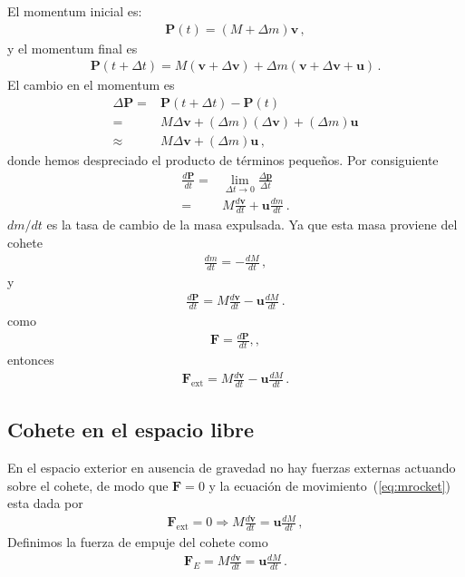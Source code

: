 El momentum inicial es:
\begin{align}
  \mathbf{P}(t)=(M+\Delta m)\mathbf{v}\,,
\end{align}
y el momentum final es
\begin{align}
  \mathbf{P}(t+\Delta t)=M(\mathbf{v}+\Delta\mathbf{v})+\Delta m(\mathbf{v}+\Delta\mathbf{v}+\mathbf{u})\,.
\end{align}
El cambio en el momentum es
\begin{align}
  \Delta\mathbf{P}=&\mathbf{P}(t+\Delta t)-\mathbf{P}(t)\nonumber\\
=&M\Delta\mathbf{v}+(\Delta m)(\Delta\mathbf{v})+(\Delta m)\mathbf{u}\nonumber\\
\approx &M\Delta\mathbf{v}+(\Delta m)\mathbf{u}\,,
\end{align}
donde hemos despreciado el producto de términos pequeños. Por consiguiente
\begin{align}
  \frac{d\mathbf{P}}{dt}=&\lim_{\Delta t\to 0}\frac{\Delta\mathbf{p}}{\Delta t}\nonumber\\
=&M\frac{d\mathbf{v}}{dt}+\mathbf{u}\frac{dm}{dt}\,.
\end{align}
$dm/dt$ es la tasa de cambio de la masa expulsada. Ya que esta masa proviene del cohete
\begin{align}
  \frac{dm}{dt}=-\frac{dM}{dt}\,,
\end{align}
y
\begin{align}
  \frac{d\mathbf{P}}{dt}=M\frac{d\mathbf{v}}{dt}-\mathbf{u}\frac{dM}{dt}\,.
\end{align}
como
\begin{align}
  \mathbf{F}=\frac{d\mathbf{P}}{dt},,
\end{align}
entonces
\begin{align}
  \label{eq:mrocket}
   \mathbf{F}_{\text{ext}}=M\frac{d\mathbf{v}}{dt}-\mathbf{u}\frac{dM}{dt}\,.
\end{align}

\subsection{Cohete en el espacio libre}

En el espacio exterior en ausencia de gravedad no hay fuerzas externas actuando sobre el cohete, de modo que $\mathbf{F}=0$ y la ecuación de movimiento~(\ref{eq:mrocket}) esta dada por
\begin{align}
\label{eq:m40}
  \mathbf{F}_{\text{ext}}=0\Longrightarrow M\frac{d\mathbf{v}}{dt}=\mathbf{u}\frac{dM}{dt}\,,
\end{align}
Definimos la fuerza de empuje del cohete como
\begin{align}
  \label{eq:m39}
  \mathbf{F}_E=M\frac{d\mathbf{v}}{dt}=\mathbf{u}\frac{dM}{dt}\,.
\end{align}

